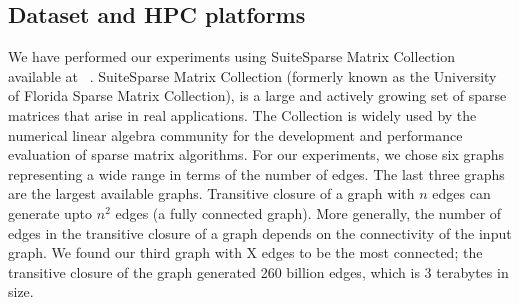 

\subsection{Dataset and HPC platforms}
\label{sec:datasets}
We have performed our experiments using SuiteSparse Matrix Collection available at ~\cite{}.
SuiteSparse Matrix Collection (formerly known as the University of Florida Sparse Matrix Collection), is a large and actively growing set of sparse matrices that arise in real applications. The Collection is widely used by the numerical linear algebra community for the development and performance evaluation of sparse matrix algorithms. 
For our experiments, we chose six graphs representing a wide range in terms of the number of edges. The last three graphs are the largest available graphs.
Transitive closure of a graph with $n$ edges can generate upto $n^2$ edges (a fully connected graph). More generally, the number of edges in the transitive closure of a graph depends on the connectivity of the input graph. We found our third graph with X edges to be the most connected; the transitive closure of the graph generated 260 billion edges, which is 3 terabytes in size.

